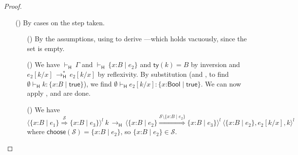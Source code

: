 \documentclass[9pt]{extarticle}
\newcommand{\ottnt}[1]{\mathit{#1}}
\newcommand{\ottsym}[1]{#1}
\begin{document}
{\begin{lemma}
\begin{proof}
{\begin{itemize}
\begin{itemize}
      \item[(\E{AppL})] By  and the IH.
      \item[(\E{AppR})] By  and the IH.
      \item[(\E{AppRaiseL})] By regularity, $ \mathord{  \vdash _{  \mathsf{H}  } }~ \ottnt{T_{{\mathrm{2}}}} $, so we are
        done by .
      \item[(\E{AppRaiseR})] By regularity, $ \mathord{  \vdash _{  \mathsf{H}  } }~ \ottnt{T_{{\mathrm{2}}}} $, so we are
        done by .
      \end{itemize}
    \item[(\T{Cast})] By cases on the step taken.
      \begin{itemize}
      \item[(\E{TypeSet})] By the assumptions, using  to
        derive ---which holds vacuously, since the set is
        empty.
      \item[(\E{CheckEmpty})] We have $ \mathord{  \vdash _{  \mathsf{H}  } }~ \Gamma $ and $ \mathord{  \vdash _{  \mathsf{H}  } }~  \{ \mathit{x} \mathord{:} \ottnt{B} \mathrel{\mid} \ottnt{e_{{\mathrm{2}}}} \}  $ and $ \mathsf{ty} ( \ottnt{k} )   \ottsym{=}  \ottnt{B}$ by inversion and $ \ottnt{e_{{\mathrm{2}}}}  [  \ottnt{k} / \mathit{x}  ]  \,  \longrightarrow ^{*}_{  \mathsf{H}  }  \,  \ottnt{e_{{\mathrm{2}}}}  [  \ottnt{k} / \mathit{x}  ] $ by reflexivity. By substitution (and
        , to find $ \emptyset   \vdash _{  \mathsf{H}  }  \ottnt{k}  :   \{ \mathit{x} \mathord{:} \ottnt{B} \mathrel{\mid}  \mathsf{true}  \}  $), we find
        $ \emptyset   \vdash _{  \mathsf{H}  }   \ottnt{e_{{\mathrm{2}}}}  [  \ottnt{k} / \mathit{x}  ]   :   \{ \mathit{x} \mathord{:}  \mathsf{Bool}  \mathrel{\mid}  \mathsf{true}  \}  $. We can now apply
        , and are done.
      \item[(\E{CheckSet})] We have \[  \langle   \{ \mathit{x} \mathord{:} \ottnt{B} \mathrel{\mid} \ottnt{e_{{\mathrm{1}}}} \}   \mathord{ \overset{ \mathcal{S} }{\Rightarrow} }   \{ \mathit{x} \mathord{:} \ottnt{B} \mathrel{\mid} \ottnt{e_{{\mathrm{3}}}} \}   \rangle^{ \ottnt{l} } ~  \ottnt{k}  \,  \longrightarrow _{  \mathsf{H}  }  \,  \langle   \{ \mathit{x} \mathord{:} \ottnt{B} \mathrel{\mid} \ottnt{e_{{\mathrm{2}}}} \}   \mathord{ \overset{  \mathcal{S}  \setminus   \{ \mathit{x} \mathord{:} \ottnt{B} \mathrel{\mid} \ottnt{e_{{\mathrm{2}}}} \}   }{\Rightarrow} }   \{ \mathit{x} \mathord{:} \ottnt{B} \mathrel{\mid} \ottnt{e_{{\mathrm{3}}}} \}   \rangle^{ \ottnt{l} } ~   \langle   \{ \mathit{x} \mathord{:} \ottnt{B} \mathrel{\mid} \ottnt{e_{{\mathrm{2}}}} \}  ,   \ottnt{e_{{\mathrm{2}}}}  [  \ottnt{k} / \mathit{x}  ]  ,  \ottnt{k}  \rangle^{ \ottnt{l} }   \] where $ \mathsf{choose} ( \mathcal{S} )   \ottsym{=}   \{ \mathit{x} \mathord{:} \ottnt{B} \mathrel{\mid} \ottnt{e_{{\mathrm{2}}}} \} $, so $  \{ \mathit{x} \mathord{:} \ottnt{B} \mathrel{\mid} \ottnt{e_{{\mathrm{2}}}} \}   \in  \mathcal{S} $.

\end{itemize}
\end{itemize}}
\end{proof}
\end{lemma}}
\end{document}
